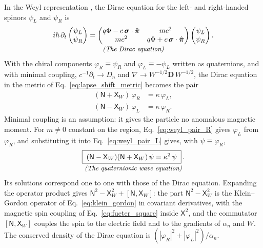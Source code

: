 \documentclass[aps,prd,onecolumn,tightenlines,nofootinbib,notitlepage,11pt,floatfix]{revtex4-2}
\theoremstyle{indentedtheorem}
\begin{document}
In the Weyl representation \citep{Peskin1995Introduction}, the Dirac equation \citep{Dirac1928Quantum} for the left- and right-handed spinors $\psi_L$ and $\psi_R$ is
\begin{equation}
    \begin{gathered}
    i\hbar\,\partial_t \begin{pmatrix}\psi_L\\ \psi_R\end{pmatrix} = \begin{pmatrix} q\Phi - c\,\boldsymbol{\sigma}\cdot\hat{\boldsymbol{\pi}} & mc^2 \\ mc^2 & q\Phi + c\,\boldsymbol{\sigma}\cdot\hat{\boldsymbol{\pi}} \end{pmatrix} \begin{pmatrix}\psi_L\\ \psi_R\end{pmatrix} . \\[-3pt]
    \text{\small\itshape (The Dirac equation)}
    \end{gathered}
    \label{eq:dirac_equation}
\end{equation}
With the chiral components $\varphi_R\equiv\psi_R$ and $\varphi_L\equiv-\psi_L$ written as quaternions, and with minimal coupling, $c^{-1}\partial_t\to D_n$ and $\nabla\to W^{-1/2}\mathbf{D}\,W^{-1/2}$, the Dirac equation in the metric of Eq.~\eqref{eq:lapse_shift_metric} becomes the pair \citep{HutchisonWavefn2026}
\begin{align}
    (\mathsf{N}+\mathsf{X}_W)\,\varphi_R &= \kappa\,\varphi_L ,
    \label{eq:weyl_pair_R} \\
    (\mathsf{N}-\mathsf{X}_W)\,\varphi_L &= \kappa\,\varphi_R .
    \label{eq:weyl_pair_L}
\end{align}
Minimal coupling is an assumption: it gives the particle no anomalous magnetic moment. For $m\neq0$ constant on the region, Eq.~\eqref{eq:weyl_pair_R} gives $\varphi_L$ from $\varphi_R$, and substituting it into Eq.~\eqref{eq:weyl_pair_L} gives, with $\psi\equiv\varphi_R$,
\begin{equation}
    \begin{gathered}
    \boxed{\; (\mathsf{N}-\mathsf{X}_W)(\mathsf{N}+\mathsf{X}_W) \, \psi = \kappa^2 \, \psi \;} \, . \\[-3pt]
    \text{\small\itshape (The quaternionic wave equation)}
    \end{gathered}
    \label{eq:pure_form}
\end{equation}
Its solutions correspond one to one with those of the Dirac equation. Expanding the operator product gives $\mathsf{N}^2-\mathsf{X}_W^2+[\mathsf{N},\mathsf{X}_W]$: the part $\mathsf{N}^2-\mathsf{X}_W^2$ is the Klein--Gordon operator of Eq.~\eqref{eq:klein_gordon} in covariant derivatives, with the magnetic spin coupling of Eq.~\eqref{eq:fueter_square} inside $\mathsf{X}^2$, and the commutator $[\mathsf{N},\mathsf{X}_W]$ couples the spin to the electric field and to the gradients of $\alpha_n$ and $W$. The conserved density of the Dirac equation is $(|\varphi_R|^2+|\varphi_L|^2)/\alpha_n$.
\end{document}
